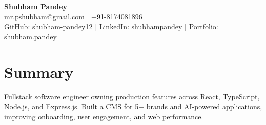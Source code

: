 \documentclass[a4paper,10pt]{article}
\begin{document}
\begin{center}
{\LARGE\textbf{Shubham Pandey}}\\[3pt]
\href{mailto:mr.pshubham@gmail.com}{mr.pshubham@gmail.com} | +91-8174081896\\[2pt]
\href{https://github.com/shubham-pandey12}{GitHub: shubham-pandey12} | \href{https://www.linkedin.com/in/shubham-pandey-a74716199/}{LinkedIn: shubhampandey} | \href{https://shubham-portfolio-mocha.vercel.app/}{Portfolio: shubham.pandey}
\end{center}
\section{Summary}
Fullstack software engineer owning production features across React, TypeScript, Node.js, and Express.js. Built a CMS for 5+ brands and AI-powered applications, improving onboarding, user engagement, and web performance.
\end{document}
